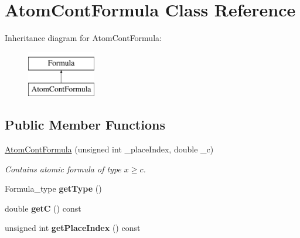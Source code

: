 \hypertarget{classAtomContFormula}{\section{Atom\-Cont\-Formula Class Reference}
\label{classAtomContFormula}
}
Inheritance diagram for Atom\-Cont\-Formula\-:\begin{figure}[H]
\begin{center}
\leavevmode
\includegraphics[height=2.000000cm]{classAtomContFormula}
\end{center}
\end{figure}
\subsection*{Public Member Functions}
\begin{DoxyCompactItemize}
\item 
\hyperlink{classAtomContFormula_a57d79f06baad31ddb734cb1b7ac128bb}{Atom\-Cont\-Formula} (unsigned int \-\_\-place\-Index, double \-\_\-c)
\begin{DoxyCompactList}\small\item\em Contains atomic formula of type $x \geq c $. \end{DoxyCompactList}\item 
\hypertarget{classAtomContFormula_a31fc3eea53c83452f05294e6d72ef819}{Formula\-\_\-type {\bfseries get\-Type} ()}\label{classAtomContFormula_a31fc3eea53c83452f05294e6d72ef819}

\item 
\hypertarget{classAtomContFormula_af119aa721b68f164fadca6e45361c221}{double {\bfseries get\-C} () const }\label{classAtomContFormula_af119aa721b68f164fadca6e45361c221}

\item 
\hypertarget{classAtomContFormula_afdc6917482500a40d8cdbef6a6ab1d8b}{unsigned int {\bfseries get\-Place\-Index} () const }\label{classAtomContFormula_afdc6917482500a40d8cdbef6a6ab1d8b}

\end{DoxyCompactItemize}


